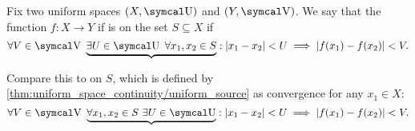 \begin{definition}\label{def:uniform_continuity}\cite[435]{Engelking1989}
  Fix two uniform spaces \( (X, \U) \) and \( (Y, \V) \). We say that the function \( f: X \to Y \) if is  on the set \( S \subseteq X \) if
  \begin{equation}\label{def:uniform_continuity/uniform}
    \forall V \in \V \ \underbrace{\exists U \in \U \ \forall x_1, x_2 \in S} : \Abs{x_1 - x_2} < U \implies \Abs{f(x_1) - f(x_2)} < V.
  \end{equation}

  Compare this to  on \( S \), which is defined by \cref{thm:uniform_space_continuity/uniform_source} as convergence for any \( x_1 \in X \):
  \begin{equation}\label{def:uniform_continuity/pointwise}
    \forall V \in \V \ \underbrace{\forall x_1, x_2 \in S \ \exists U \in \U} : \Abs{x_1 - x_2} < U \implies \Abs{f(x_1) - f(x_2)} < V.
  \end{equation}
\end{definition}

